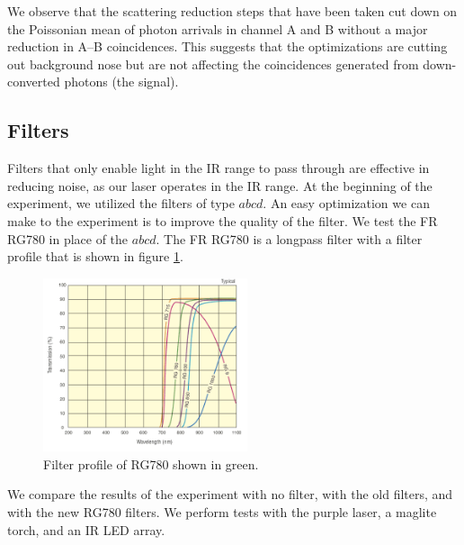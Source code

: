 \documentclass[letterpaper, 11 pt]{article}
\begin{document}
We observe that the scattering reduction steps that have been taken cut down on
the Poissonian mean of photon arrivals in channel A and B without a major
reduction in A--B coincidences. This suggests that the optimizations are cutting
out background nose but are not affecting the coincidences generated from
down-converted photons (the signal). 

\subsection{Filters}

Filters that only enable light in the IR range to pass through are effective in
reducing noise, as our laser operates in the IR range. At the beginning of the
experiment, we utilized the filters of type $abcd$. An easy optimization we can
make to the experiment is to improve the quality of the filter. We test the FR
RG780 in place of the $abcd$. The FR RG780 is a longpass filter with a filter
profile that is shown in figure \ref{fig:filter_prof}.
\begin{figure}[H]
    \centering
    \includegraphics[width = 6cm]{COLOR_FILT_XMIT_8_600w.png}
    \caption{Filter profile of RG780 shown in green.}
    \label{fig:filter_prof}
\end{figure}

We compare the results of the experiment with no filter, with the old filters,
and with the new RG780 filters. We perform tests with the purple laser, a
maglite torch, and an IR LED array.
\end{document}
